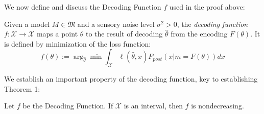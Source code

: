 We now define and discuss the Decoding Function $f$ used in the proof above:
\begin{defin}\label{def:decoding-funct}
    Given a model $M \in \mathfrak{M}$ and a sensory noise level $\sigma^2 > 0$, the \emph{decoding function} $f : \mathcal{X} \rightarrow \mathcal{X}$ maps a point $\theta$ to the result of decoding $\widehat{\theta}$ from the encoding $F(\theta)$. It is defined by minimization of the loss function:
    \begin{equation}
        f(\theta) := \arg_{\widehat{\theta}}\min \int_{\mathcal{X}} \ell(\widehat{\theta}, x) P_{post}(x|m=F(\theta)) dx
    \end{equation}
\end{defin}
We establish an important property of the decoding function, key to establishing Theorem 1:
\begin{lemma}\label{lemma:monot-dec}
 Let $f$ be the Decoding Function.  If $\mathcal{X}$ is an interval, then $f$ is nondecreasing.
\end{lemma}
